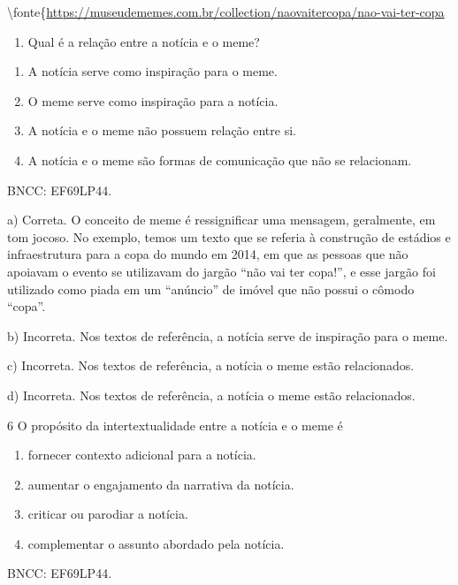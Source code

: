 \textbackslash fonte\{\url{https://museudememes.com.br/collection/naovaitercopa/nao-vai-ter-copa}

\begin{enumerate}
\def\labelenumi{\arabic{enumi}.}
\setcounter{enumi}{4}
\tightlist
\item
  Qual é a relação entre a notícia e o meme?
\end{enumerate}

\begin{enumerate}
\def\labelenumi{\alph{enumi})}
\item
  A notícia serve como inspiração para o meme.
\item
  O meme serve como inspiração para a notícia.
\item
  A notícia e o meme não possuem relação entre si.
\item
  A notícia e o meme são formas de comunicação que não se relacionam.
\end{enumerate}

BNCC: EF69LP44.

a) Correta. O conceito de meme é ressignificar uma mensagem, geralmente,
em tom jocoso. No exemplo, temos um texto que se referia à construção de
estádios e infraestrutura para a copa do mundo em 2014, em que as
pessoas que não apoiavam o evento se utilizavam do jargão ``não vai ter
copa!'', e esse jargão foi utilizado como piada em um ``anúncio'' de
imóvel que não possui o cômodo ``copa''.

b) Incorreta. Nos textos de referência, a notícia serve de inspiração
para o meme.

c) Incorreta. Nos textos de referência, a notícia o meme estão
relacionados.

d) Incorreta. Nos textos de referência, a notícia o meme estão
relacionados.

\num{6} O propósito da intertextualidade entre a notícia e o meme é

\begin{enumerate}
\def\labelenumi{\alph{enumi})}
\item
  fornecer contexto adicional para a notícia.
\item
  aumentar o engajamento da narrativa da notícia.
\item
  criticar ou parodiar a notícia.
\item
  complementar o assunto abordado pela notícia.
\end{enumerate}

BNCC: EF69LP44.

